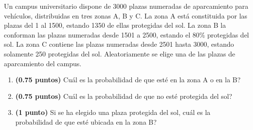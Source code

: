
Un campus universitario dispone de 3000 plazas numeradas de aparcamiento para vehículos, distribuidas en tres zonas A, B y C. La zona A está constituida por las plazas del 1 al 1500, estando 1350 de ellas protegidas del sol. La zona B la conforman las plazas numeradas desde 1501 a 2500, estando el 80\% protegidas del sol. La zona C contiene las plazas numeradas desde 2501 hasta 3000, estando solamente 250 protegidas del sol. Aleatoriamente se elige una de las plazas de aparcamiento del campus.
\begin{enumerate}[label=\alph*)]
\item \textbf{(0.75 puntos)} \textquestiondown{}Cuál es la probabilidad de que esté en la zona A o en la B?
\item \textbf{(0.75 puntos)} \textquestiondown{}Cuál es la probabilidad de que no esté protegida del sol?
\item \textbf{(1 punto)} Si se ha elegido una plaza protegida del sol, \textquestiondown{}cuál es la probabilidad de que esté ubicada en la zona B?
\end{enumerate}
